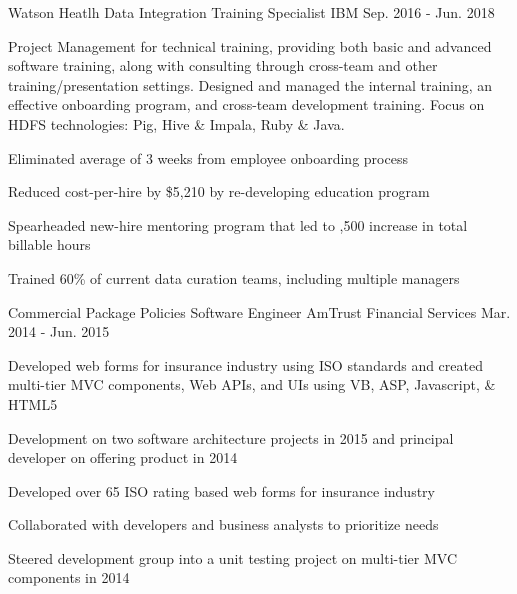 \begin{cventries}
  \cventry
    {Watson Heatlh} %
    {Data Integration Training Specialist} %
    {IBM} %
    {Sep. 2016 - Jun. 2018} %
    {
      \begin{cvparagraph}
        Project Management for technical training, providing both basic and advanced software training, along with consulting through cross-team and other training/presentation settings.  Designed and managed the internal training, an effective onboarding program, and cross-team development training.  Focus on HDFS technologies: Pig, Hive \& Impala, Ruby \& Java.  
      \end{cvparagraph}
      \begin{cvitems} %
        \item {Eliminated average of 3 weeks from employee onboarding process}
        \item {Reduced cost-per-hire by \$5,210 by re-developing education program}
        \item {Spearheaded new-hire mentoring program that led to ,500 increase in total billable hours}
        \item {Trained 60\% of current data curation teams, including multiple managers}
      \end{cvitems}
    }

  \cventry
    {Commercial Package Policies} %
    {Software Engineer} %
    {AmTrust Financial Services} %
    {Mar. 2014 - Jun. 2015} %
    {
      \begin{cvparagraph}
        Developed web forms for insurance industry using ISO standards and created multi-tier MVC components, Web APIs, and UIs using VB, ASP, Javascript, \& HTML5
      \end{cvparagraph}
      \begin{cvitems} %
        \item {Development on two software architecture projects in 2015 and principal developer on offering product in 2014}
        \item {Developed over 65 ISO rating based web forms for insurance industry}
        \item {Collaborated with developers and business analysts to prioritize needs}
        \item {Steered development group into a unit testing project on multi-tier MVC components in 2014}
      \end{cvitems}
    }


\end{cventries}
